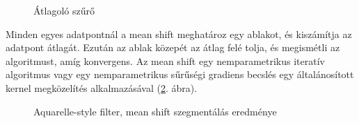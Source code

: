 \begin{figure}[ht]
\centering
{}
\caption{Átlagoló szűrő  } 
\label{fig:paint1}
\end{figure}


Minden egyes adatpontnál a mean shift meghatároz egy ablakot, és kiszámítja az adatpont átlagát. Ezután az ablak közepét az átlag felé tolja, és megismétli az algoritmust, amíg konvergens. Az mean shift egy nemparametrikus iteratív algoritmus vagy egy nemparametrikus sűrűségi gradiens becslés egy általánosított kernel megközelítés alkalmazásával (\ref{fig:paint2}. ábra).

\begin{figure}[ht]
\centering
{}
\caption{Aquarelle-style filter, mean shift szegmentálás  eredménye} 
\label{fig:paint2}
\end{figure}

